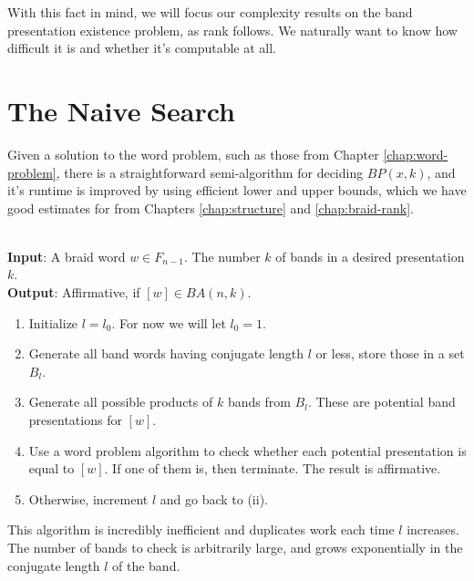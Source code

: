 \documentclass[12pt]{thesis}
\begin{document}
With this fact in mind, we will focus our complexity results on the band presentation existence problem,
as rank follows.
We naturally want to know how difficult it is and whether it's computable at all.

\section{The Naive Search}

\label{naiive-search}

Given a solution to the word problem, such as those from Chapter \ref{chap:word-problem},
there is a straightforward semi-algorithm for deciding $BP(x, k)$,
and it's runtime is improved by using
efficient lower and upper bounds, which we have good estimates for from Chapters \ref{chap:structure} and \ref{chap:braid-rank}.

\begin{algorithm}

    \label{algo:naive-search}
    ~\\
    \textbf{Input}: A braid word $w \in F_{n-1}$. The number $k$ of bands in a desired presentation $k$.
    ~\\
    \textbf{Output}: Affirmative, if $[w] \in BA(n, k)$.

\begin{enumerate}
    \item Initialize $l = l_{0}$.
          For now we will let $l_{0} = 1$.

    \item Generate all band words having conjugate length $l$ or less,
        store those in a set $B_{l}$.

    \item Generate all possible products of $k$ bands from $B_{l}$.
          These are potential band presentations for $[w]$.

    \item Use a word problem algorithm to check whether each potential 
          presentation is equal to $[w]$.
          If one of them is, then terminate. The result is affirmative.

      \item Otherwise, increment $l$ and go back to (ii).
\end{enumerate}

\end{algorithm}

This algorithm is incredibly inefficient and duplicates work each time $l$ increases.
The number of bands to check is arbitrarily large,
and grows exponentially in the conjugate length $l$ of the band.
\end{document}
